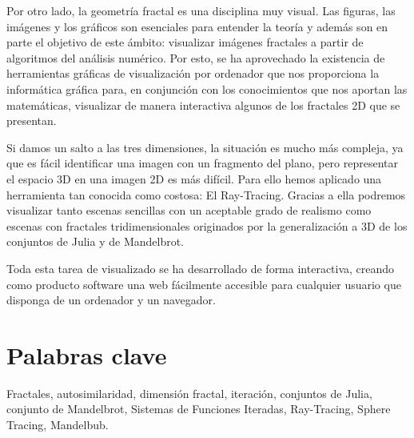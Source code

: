 Por otro lado, la geometría fractal es una disciplina muy visual. Las figuras, las imágenes y los gráficos son esenciales para entender la teoría y además son en parte el objetivo de este ámbito: visualizar imágenes fractales a partir de algoritmos del análisis numérico. Por esto, se ha aprovechado la existencia de herramientas gráficas de visualización por ordenador que nos proporciona la informática gráfica para, en conjunción con los conocimientos que nos aportan las matemáticas, visualizar de manera interactiva algunos de los fractales 2D que se presentan. 

Si damos un salto a las tres dimensiones, la situación es mucho más compleja, ya que es fácil identificar una imagen con un fragmento del plano, pero representar el espacio 3D en una imagen 2D es más difícil. Para ello hemos aplicado una herramienta tan conocida como costosa: El Ray-Tracing. Gracias a ella podremos visualizar tanto escenas sencillas con un aceptable grado de realismo como escenas con fractales tridimensionales originados por la generalización a 3D de los conjuntos de Julia y de Mandelbrot.

Toda esta tarea de visualizado se ha desarrollado de forma interactiva, creando como producto software una web fácilmente accesible para cualquier usuario que disponga de un ordenador y un navegador.

\section*{Palabras clave}

Fractales, autosimilaridad, dimensión fractal, iteración, conjuntos de Julia, conjunto de Mandelbrot, Sistemas de Funciones Iteradas, Ray-Tracing, Sphere Tracing, Mandelbub. 